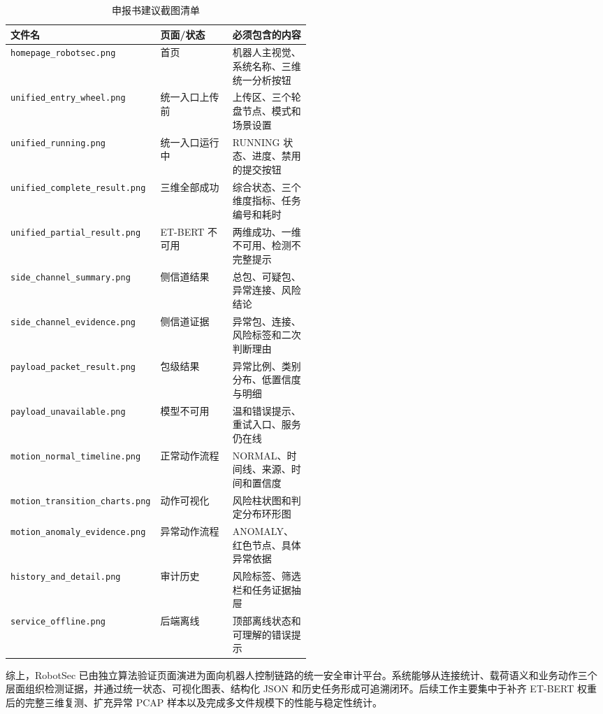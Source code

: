 \begin{table}[H]
\centering
\caption{申报书建议截图清单}
\label{tab:screenshot_checklist}
\scriptsize
\begin{tabularx}{\linewidth}{p{0.26\linewidth}p{0.24\linewidth}X}
\toprule
\textbf{文件名} & \textbf{页面/状态} & \textbf{必须包含的内容} \\
\midrule
\texttt{homepage\_robotsec.png} & 首页 & 机器人主视觉、系统名称、三维统一分析按钮 \\
\texttt{unified\_entry\_wheel.png} & 统一入口上传前 & 上传区、三个轮盘节点、模式和场景设置 \\
\texttt{unified\_running.png} & 统一入口运行中 & RUNNING 状态、进度、禁用的提交按钮 \\
\texttt{unified\_complete\_result.png} & 三维全部成功 & 综合状态、三个维度指标、任务编号和耗时 \\
\texttt{unified\_partial\_result.png} & ET-BERT 不可用 & 两维成功、一维不可用、检测不完整提示 \\
\texttt{side\_channel\_summary.png} & 侧信道结果 & 总包、可疑包、异常连接、风险结论 \\
\texttt{side\_channel\_evidence.png} & 侧信道证据 & 异常包、连接、风险标签和二次判断理由 \\
\texttt{payload\_packet\_result.png} & 包级结果 & 异常比例、类别分布、低置信度与明细 \\
\texttt{payload\_unavailable.png} & 模型不可用 & 温和错误提示、重试入口、服务仍在线 \\
\texttt{motion\_normal\_timeline.png} & 正常动作流程 & NORMAL、时间线、来源、时间和置信度 \\
\texttt{motion\_transition\_charts.png} & 动作可视化 & 风险柱状图和判定分布环形图 \\
\texttt{motion\_anomaly\_evidence.png} & 异常动作流程 & ANOMALY、红色节点、具体异常依据 \\
\texttt{history\_and\_detail.png} & 审计历史 & 风险标签、筛选栏和任务证据抽屉 \\
\texttt{service\_offline.png} & 后端离线 & 顶部离线状态和可理解的错误提示 \\
\bottomrule
\end{tabularx}
\end{table}

综上，RobotSec 已由独立算法验证页面演进为面向机器人控制链路的统一安全审计平台。系统能够从连接统计、载荷语义和业务动作三个层面组织检测证据，并通过统一状态、可视化图表、结构化 JSON 和历史任务形成可追溯闭环。后续工作主要集中于补齐 ET-BERT 权重后的完整三维复测、扩充异常 PCAP 样本以及完成多文件规模下的性能与稳定性统计。
